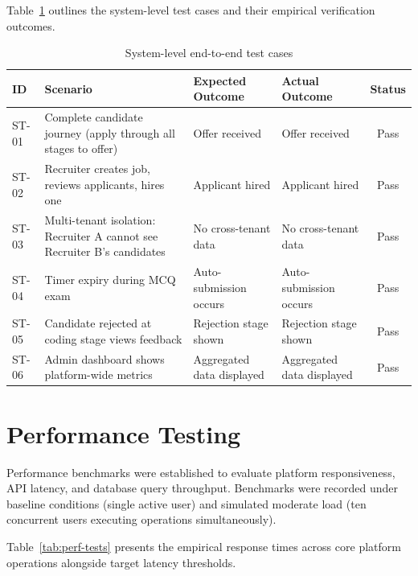 Table~\ref{tab:system-tests} outlines the system-level test cases and their empirical verification outcomes.

\begin{table}[H]
\centering
\caption{System-level end-to-end test cases}
\label{tab:system-tests}
\small
\begin{tabularx}{\textwidth}{l X X X c}
\toprule
\textbf{ID} & \textbf{Scenario} & \textbf{Expected Outcome} & \textbf{Actual Outcome} & \textbf{Status} \\
\midrule
ST-01 & Complete candidate journey (apply through all stages to offer) & Offer received & Offer received & Pass \\
ST-02 & Recruiter creates job, reviews applicants, hires one & Applicant hired & Applicant hired & Pass \\
ST-03 & Multi-tenant isolation: Recruiter A cannot see Recruiter B's candidates & No cross-tenant data & No cross-tenant data & Pass \\
ST-04 & Timer expiry during MCQ exam & Auto-submission occurs & Auto-submission occurs & Pass \\
ST-05 & Candidate rejected at coding stage views feedback & Rejection stage shown & Rejection stage shown & Pass \\
ST-06 & Admin dashboard shows platform-wide metrics & Aggregated data displayed & Aggregated data displayed & Pass \\
\bottomrule
\end{tabularx}
\end{table}

\section{Performance Testing}
\label{sec:perf-tests}

Performance benchmarks were established to evaluate platform responsiveness, API latency, and database query throughput. Benchmarks were recorded under baseline conditions (single active user) and simulated moderate load (ten concurrent users executing operations simultaneously).

Table~\ref{tab:perf-tests} presents the empirical response times across core platform operations alongside target latency thresholds.

